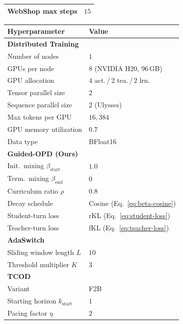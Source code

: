 \documentclass[11pt]{article}
\begin{document}
\begin{table}[t]
\begin{minipage}[t]{0.48\textwidth}
\begin{tabular}{ll}
\quad WebShop max steps & $15$ \\
\bottomrule
\end{tabular}
\end{minipage}\hfill
\begin{minipage}[t]{0.48\textwidth}
\centering
\begin{tabular}{ll}
\toprule
\textbf{Hyperparameter} & \textbf{Value} \\
\midrule
\textbf{Distributed Training} & \\
\quad Number of nodes & $1$ \\
\quad GPUs per node & $8$ (NVIDIA H20, 96\,GB) \\
\quad GPU allocation & $4$ act.\,/\,$2$ tea.\,/\,$2$ lrn. \\
\quad Tensor parallel size & $2$ \\
\quad Sequence parallel size & $2$ (Ulysses) \\
\quad Max tokens per GPU & $16{,}384$ \\
\quad GPU memory utilization & $0.7$ \\
\quad Data type & BFloat16 \\
\midrule
\textbf{Guided-OPD (Ours)} & \\
\quad Init.\ mixing $\beta_{\text{start}}$ & $1.0$ \\
\quad Term.\ mixing $\beta_{\text{end}}$ & $0$ \\
\quad Curriculum ratio $\rho$ & $0.8$ \\
\quad Decay schedule & Cosine (Eq.~\ref{eq:beta-cosine}) \\
\quad Student-turn loss & rKL (Eq.~\ref{eq:student-loss}) \\
\quad Teacher-turn loss & fKL (Eq.~\ref{eq:teacher-loss}) \\
\midrule
\textbf{AdaSwitch~\citep{AdaSwitch}} & \\
\quad Sliding window length $L$ & $10$ \\
\quad Threshold multiplier $K$ & $3$ \\
\midrule
\textbf{TCOD~\citep{wang2026tcod}} & \\
\quad Variant & F2B \\
\quad Starting horizon $k_{\text{start}}$ & $1$ \\
\quad Pacing factor $\eta$ & $2$ \\
\bottomrule
\end{tabular}
\end{minipage}
\end{table}
\end{document}
